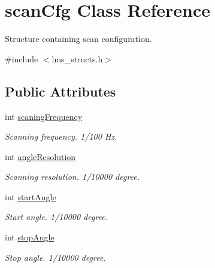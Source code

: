 \hypertarget{structscanCfg}{}\section{scan\+Cfg Class Reference}
\label{structscanCfg}


Structure containing scan configuration.  




{\ttfamily \#include $<$lms\+\_\+structs.\+h$>$}

\subsection*{Public Attributes}
\begin{DoxyCompactItemize}
\item 
\mbox{\label{structscanCfg_a5749b8e4ce064c455d944c588cf63bfc}} 
int \hyperlink{structscanCfg_a5749b8e4ce064c455d944c588cf63bfc}{scaning\+Frequency}
\begin{DoxyCompactList}\small\item\em Scanning frequency. 1/100 Hz. \end{DoxyCompactList}\item 
\mbox{\label{structscanCfg_a003ece4b9a8072966e557bd7cdecc238}} 
int \hyperlink{structscanCfg_a003ece4b9a8072966e557bd7cdecc238}{angle\+Resolution}
\begin{DoxyCompactList}\small\item\em Scanning resolution. 1/10000 degree. \end{DoxyCompactList}\item 
\mbox{\label{structscanCfg_a64d848af5dad2ea1590ea1ff157c4364}} 
int \hyperlink{structscanCfg_a64d848af5dad2ea1590ea1ff157c4364}{start\+Angle}
\begin{DoxyCompactList}\small\item\em Start angle. 1/10000 degree. \end{DoxyCompactList}\item 
\mbox{\label{structscanCfg_a1d3584f03a6092fdcb5ccd8133beacee}} 
int \hyperlink{structscanCfg_a1d3584f03a6092fdcb5ccd8133beacee}{stop\+Angle}
\begin{DoxyCompactList}\small\item\em Stop angle. 1/10000 degree. \end{DoxyCompactList}\end{DoxyCompactItemize}


